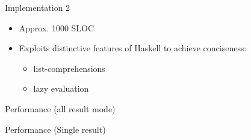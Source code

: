 \begin{frame}{Implementation 2}

\scalebox{0.75}{}

\begin{itemize}
\itemsep1pt\parskip0pt
\item
  Approx. 1000 SLOC
\item
  Exploits distinctive features of Haskell to achieve conciseness:

  \begin{itemize}
  \itemsep1pt\parskip0pt
  \item
    list-comprehensions
  \item
    lazy evaluation
  \end{itemize}
\end{itemize}

\end{frame}

\begin{frame}{Performance (all result mode)}


\end{frame}

\begin{frame}{Performance (Single result)}


\end{frame}

